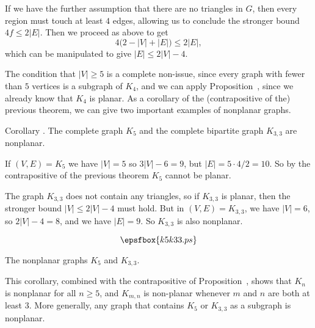 If we have the further assumption that there are no triangles in $G$, then every region must
touch at least $4$ edges, allowing us to conclude the stronger bound $4f \le 2|E|$. Then we proceed
as above to get
$$4\bigl( 2-|V|+|E|\bigr) \le 2|E|,$$
which can be manipulated to give $|E|\le 2|V|-4$.\slug

The condition that $|V|\ge 5$ is a complete non-issue, since every graph with fewer than $5$
vertices is a subgraph of $K_4$, and we can apply Proposition~{\propsubgraphplanar},
since we already know that $K_4$ is planar. As a corollary of the (contrapositive of the)
previous theorem, we can give two important examples of nonplanar graphs.

\proclaim Corollary \advthm.  The complete graph $K_5$ and the complete bipartite graph $K_{3,3}$
are nonplanar.

\proof If $(V,E) = K_5$ we have $|V| = 5$ so $3|V| - 6 = 9$,
but $|E| = 5\cdot 4 / 2 = 10$. So by the contrapositive of the previous theorem $K_5$ cannot
be planar.

The graph $K_{3,3}$ does not contain any triangles, so if $K_{3,3}$ is planar, then the
stronger bound $|V| \le 2|V|-4$ must hold. But in $(V,E) = K_{3,3}$, we have $|V| = 6$,
so $2|V|-4 = 8$, and we have $|E| = 9$. So $K_{3,3}$ is also nonplanar.\slug

\midinsert
$$\epsfbox{k5k33.ps}$$
\vskip5pt
\caption{The nonplanar graphs $K_5$ and $K_{3,3}$.}
\endinsert
\goodbreak

This corollary, combined with the contrapositive of Proposition~{\propsubgraphplanar},
shows that $K_n$ is nonplanar for all $n\ge 5$, and $K_{m,n}$ is non-planar whenever
$m$ and $n$ are both at least $3$. More generally, any graph that contains $K_5$ or $K_{3,3}$
as a subgraph is nonplanar.

